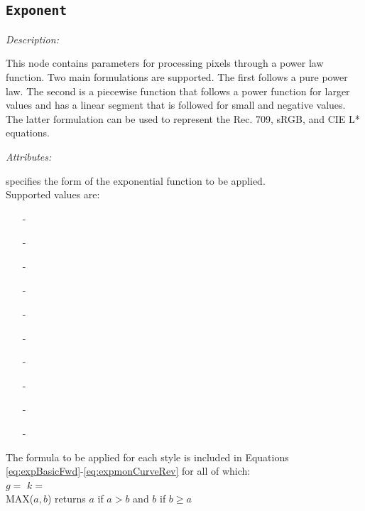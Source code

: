 \subsection{\texttt{Exponent}}

\emph{Description:} \par
This node contains parameters for processing pixels through a power law function. Two main formulations are supported. The first follows a pure power law. The second is a piecewise function that follows a power function for larger values and has a linear segment that is followed for small and negative values. The latter formulation can be used to represent the Rec. 709, sRGB, and CIE L* equations.

\emph{Attributes:}
\begin{xmlfields}
    \xmlitem[style][required] specifies the form of the exponential function to be applied.\\
        Supported values are: 
            \begin{itemize}
                \item[-] 
                \item[-] 
                \item[-] 
                \item[-] 
                \item[-] 
                \item[-] 
                \item[-] 
                \item[-] 
                \item[-] 
                \item[-] 
            \end{itemize}

        The formula to be applied for each style is included in Equations \ref{eq:expBasicFwd}-\ref{eq:expmonCurveRev} for all of which: \\[10pt]
        \tabto{0.75in} $g =$  \tabto {2in} $k =$ \\[10pt]
        \tabto{0.75in} MAX(${a,b}$) returns $a$ if $a > b$ and $b$ if $b \geq a$


\end{xmlfields}
